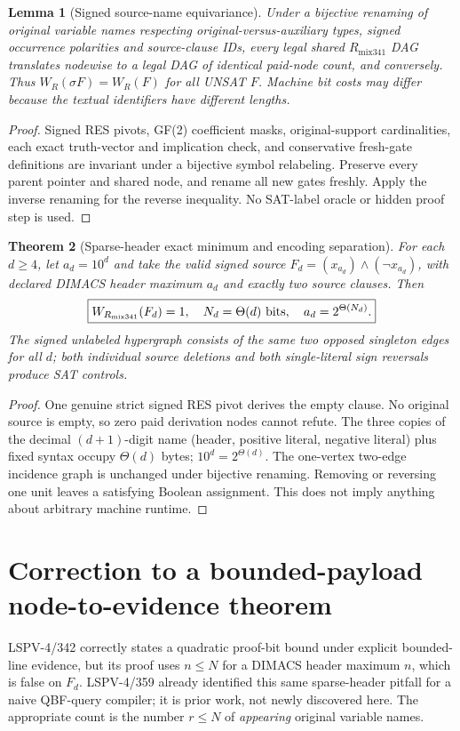\documentclass[11pt]{article}
\newtheorem{theorem}{Theorem}
\newtheorem{lemma}[theorem]{Lemma}
\begin{document}
\begin{lemma}[Signed source-name equivariance]
Under a bijective renaming of original variable names respecting original-versus-auxiliary types, signed occurrence polarities and source-clause IDs, every legal shared $R_{\mathrm{mix341}}$ DAG translates nodewise to a legal DAG of identical paid-node count, and conversely. Thus $W_R(\sigma F)=W_R(F)$ for all UNSAT $F$. Machine bit costs may differ because the textual identifiers have different lengths.
\end{lemma}
\begin{proof} Signed RES pivots, GF(2) coefficient masks, original-support cardinalities, each exact truth-vector and implication check, and conservative fresh-gate definitions are invariant under a bijective symbol relabeling. Preserve every parent pointer and shared node, and rename all new gates freshly. Apply the inverse renaming for the reverse inequality. No SAT-label oracle or hidden proof step is used.\end{proof}

\begin{theorem}[Sparse-header exact minimum and encoding separation]
For each $d\ge4$, let $a_d=10^d$ and take the valid signed source $F_d=(x_{a_d})\wedge(\neg x_{a_d})$, with declared DIMACS header maximum $a_d$ and exactly two source clauses. Then
\[
\boxed{W_{R_{\mathrm{mix341}}}(F_d)=1,\quad N_d=\Theta(d)\ {\rm bits},\quad a_d=2^{\Theta(N_d)}.}
\]
The signed unlabeled hypergraph consists of the same two opposed singleton edges for all $d$; both individual source deletions and both single-literal sign reversals produce SAT controls.
\end{theorem}
\begin{proof} One genuine strict signed RES pivot derives the empty clause. No original source is empty, so zero paid derivation nodes cannot refute. The three copies of the decimal $(d+1)$-digit name (header, positive literal, negative literal) plus fixed syntax occupy $\Theta(d)$ bytes; $10^d=2^{\Theta(d)}$. The one-vertex two-edge incidence graph is unchanged under bijective renaming. Removing or reversing one unit leaves a satisfying Boolean assignment. This does not imply anything about arbitrary machine runtime.\end{proof}

\section*{Correction to a bounded-payload node-to-evidence theorem}
LSPV-4/342 correctly states a quadratic proof-bit bound under explicit bounded-line evidence, but its proof uses $n\le N$ for a DIMACS header maximum $n$, which is false on $F_d$. LSPV-4/359 already identified this same sparse-header pitfall for a naive QBF-query compiler; it is prior work, not newly discovered here. The appropriate count is the number $r\le N$ of \emph{appearing} original variable names.
\end{document}
